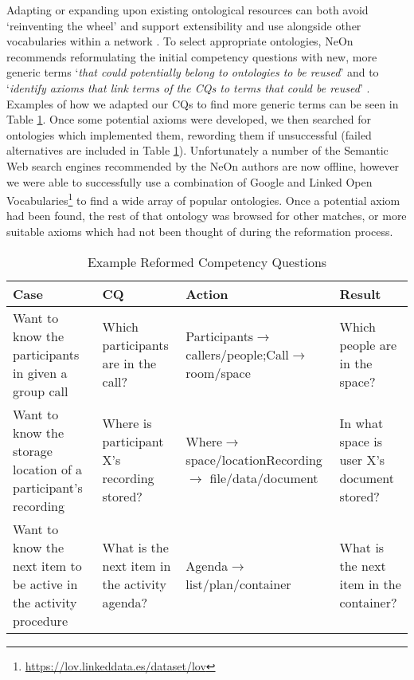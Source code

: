 Adapting or expanding upon existing ontological resources can both avoid `reinventing the wheel' \cite{suarez2012} and support extensibility and use alongside other vocabularies within a network \cite{scherp2011}. To select appropriate ontologies, NeOn recommends reformulating the initial competency questions with new, more generic terms `\textit{that could potentially belong to ontologies to be reused}' and to `\textit{identify axioms that link terms of the CQs to terms that could be reused}' \cite{suarez2012_reuse}. Examples of how we adapted our CQs to find more generic terms can be seen in Table \ref{tab:CQ_reformed}. Once some potential axioms were developed, we then searched for ontologies which implemented them, rewording them if unsuccessful (failed alternatives are included in Table \ref{tab:CQ_reformed}). Unfortunately a number of the Semantic Web search engines recommended by the NeOn authors are now offline, however we were able to successfully use a combination of Google and Linked Open Vocabularies\footnote{\url{https://lov.linkeddata.es/dataset/lov}} to find a wide array of popular ontologies. Once a potential axiom had been found, the rest of that ontology was browsed for other matches, or more suitable axioms which had not been thought of during the reformation process.

\begin{table}
  \caption{Example Reformed Competency Questions}
  \label{tab:CQ_reformed}
  \begin{tabular}{p{3.2cm} p{3cm} p{2.8cm} p{3cm} }
    \toprule
    Case&CQ&Action&Result\\
    \midrule
    Want to know the participants in given a group call&Which participants are in the call?&Participants$\rightarrow$ \newline callers/people;\newline Call$\rightarrow$ room/space&Which people are in the space?\\ 
    \midrule
    Want to know the storage location of a participant's recording&Where is participant X’s recording stored?&Where$\rightarrow$ space/location\newline Recording$\rightarrow$ file/data/document&In what space is user X’s document stored?\\ 
    \midrule
    Want to know the next item to be active in the activity procedure&What is the next item in the activity agenda?&Agenda$\rightarrow$\newline list/plan/container&What is the next item in the container?\\ 
  \bottomrule
\end{tabular}
\end{table}


